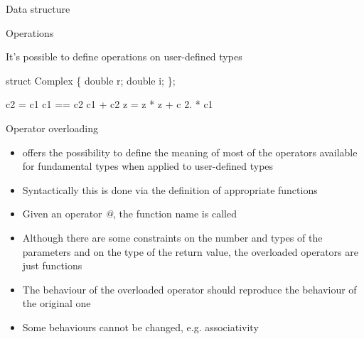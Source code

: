 \begin{frame}[fragile]{Data structure}
  \vskip -1cm


\end{frame}

\begin{frame}[fragile]{Operations}

  It's possible to define operations on user-defined types

  \begin{codeblock}
struct Complex \{
  double r;
  double i;
\};



c2 \alert<2>{=} c1
c1 \alert<3-4>{==} c2
c1 \alert<5-6>{+} c2
z = z * z + c
2. * c1
\ddd\end{codeblock}


\end{frame}

\begin{frame}[fragile]{Operator overloading}


  \begin{itemize}[<+->]
  \item \Cpp{} offers the possibility to define the meaning of most of the
    operators available for fundamental types when applied to user-defined types
  \item Syntactically this is done via the definition of appropriate functions
  \item Given an operator \textit{@}, the function name is called
  \item Although there are some constraints on the number and types of the
    parameters and on the type of the return value, the overloaded operators
    are just functions
  \item The behaviour of the overloaded operator should reproduce the behaviour
    of the original one
  \item Some behaviours cannot be changed, e.g. associativity
  \end{itemize}

\end{frame}

